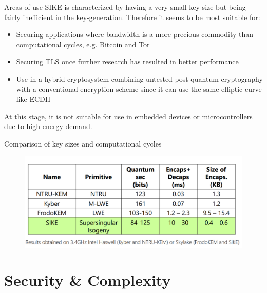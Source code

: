 \documentclass[handout]{beamer}
\begin{document}
\begin{frame}{Areas of use}
SIKE is characterized by having a very small key size but being fairly inefficient in the key-generation. Therefore it seems to be most suitable for:
\begin{itemize}[\textbullet]
	
	\item Securing applications where bandwidth is a more precious commodity than computational cycles, e.g. Bitcoin and Tor\pause
	\item Securing TLS once further research has resulted in better performance\pause
	\item Use in a hybrid cryptosystem combining untested post-quantum-cryptography with a conventional encryption scheme since it can use the same elliptic curve like ECDH	\pause
\end{itemize}
At this stage, it is not suitable for use in embedded devices or microcontrollers due to high energy demand.
\end{frame}

\begin{frame}{Comparison of key sizes and computational cycles}
\begin{figure} 
	\centering
	\includegraphics[width=1\linewidth]{performance}
	\label{fig:performance}
\end{figure}
\end{frame}

\section{Security \& Complexity}
\end{document}
